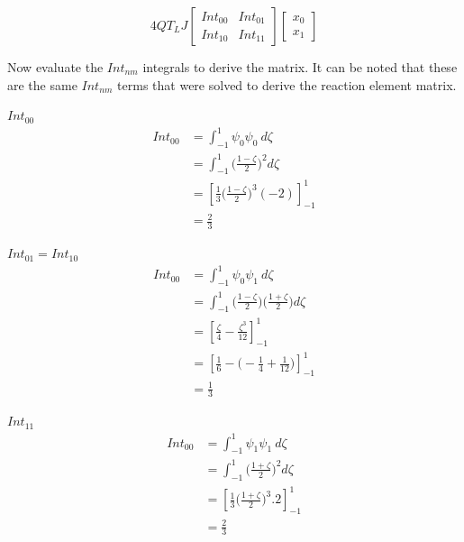 \documentclass[11pt]{article}
\begin{document}
\begin{equation} \label{eq:linSmatrix}
4QT_LJ 
\begin{bmatrix}

Int_{00} & Int_{01} \\
Int_{10} & Int_{11}
\end{bmatrix}
\begin{bmatrix}

x_{0} \\  x_{1} 
\end{bmatrix}
\end{equation}


Now evaluate the $Int_{nm}$ integrals to derive the matrix. It can be noted that these are the same $Int_{nm}$ terms that were solved to derive the reaction element matrix.

\underline{$Int_{00}$} \\
\begin{equation}\label{eq:LSInt00}
\begin{split}
 Int_{00} &= \int_{-1}^{1} \psi_{0}\psi_{0} \ d \zeta \\
&=  \int_{-1}^{1}  \Big ( \frac{1-\zeta}{2} \Big )^2 d\zeta \\
& = \left[ \frac{1}{3} \Big ( \frac{1-\zeta}{2} \Big )^3 (-2) \right]_{-1}^{1} \\
& = \frac{2}{3}
\end{split}
\end{equation}

\underline{$Int_{01} = Int_{10}$} \\

\begin{equation}\label{eq:LSInt01}
\begin{split}
 Int_{00} &= \int_{-1}^{1} \psi_{0}\psi_{1} \ d \zeta \\
&=  \int_{-1}^{1}  \Big ( \frac{1-\zeta}{2} \Big )  \Big ( \frac{1+\zeta}{2} \Big )d\zeta \\
& = \left[ \frac{\zeta}{4} - \frac{\zeta^3}{12}\right]_{-1}^{1} \\
& = \left[ \frac{1}{6} -  \Big (-\frac{1}{4} + \frac{1}{12} \Big )\right]_{-1}^{1} \\
& = \frac{1}{3}
\end{split}
\end{equation}

\underline{$Int_{11}$} \\
\begin{equation}\label{eq:LSInt00}
\begin{split}
 Int_{00} &= \int_{-1}^{1} \psi_{1}\psi_{1} \ d \zeta \\
&=  \int_{-1}^{1}  \Big ( \frac{1+\zeta}{2} \Big )^2 d\zeta \\
& = \left[ \frac{1}{3} \Big ( \frac{1+\zeta}{2}\Big)^3 . 2 \right]_{-1}^{1} \\
& = \frac{2}{3}
\end{split}
\end{equation}
\end{document}
